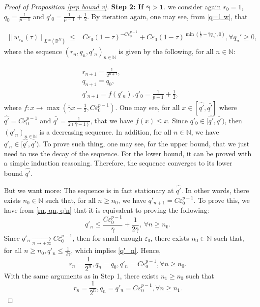 \documentclass[11pt,a4paper]{article}
\newcommand{\1}{\mathbbm{1}}
\numberwithin{equation}{section}
\newcommand{\numberset}{\mathbb}
\newcommand{\N}{\numberset{N}}
\newcommand{\R}{\numberset{R}}
\theoremstyle{remark}
\begin{document}
\begin{proof}[Proof of Proposition \ref{prp bound v}]
\textbf{Step 2: If} $\mathbf{\bar \gamma>1}$. we consider again  $r_0=1$, $q_0=\frac{1}{p-1}$ and $q'_0=\frac{1}{p-1}+\frac{1}{2}$. By iteration again, one may see, from \eqref{q=1 w}, that

\begin{equation*}
\begin{split}
\|w_{r_n}(\tau)\|_{L^\infty(\R^N)}\leq& C\varepsilon_0(1-\tau)^{-C\varepsilon_0^{p-1}}+C\varepsilon_0(1-\tau)^{\min(\frac{1}{2}-\bar \gamma q_n',0)}, \forall q_n'\geq 0,
\end{split}
\end{equation*}
where the sequence $(r_n, q_n,q'_n)_{n\in \N}$ is given by 
the following, for all $n\in \N$:

\begin{equation}\label{rn, qn, q'n}
\begin{split}
&r_{n+1}=\frac{1}{2^{n+1}},\\
& q_{n+1}=q_0,\\
&q'_{n+1}=f(q'_n), q'_0=\frac{1}{p-1}+\frac{1}{2},
\end{split}
\end{equation}
where $f:x\rightarrow\max(\bar \gamma x-\frac{1}{2},C\varepsilon_0^{p-1})$. One may see, for all $x\in [\hat{q'},\bar{q'}]$ where $\hat{q'}=C\varepsilon_0^{p-1}$ and $\bar{q'}=\frac{1}{2(\bar \gamma-1)}$, that we have $f(x)\leq x$. Since $q'_0\in [\hat{q'},\bar{q'})$, then $(q'_n)_{n\in \N}$ is a decreasing sequence. In addition, for all $n\in \N$, we have $q'_n\in [\hat{q'},\bar{q'})$. To prove such thing, one may see, for the upper bound, that we just need to use the decay of the sequence. For the lower bound, it can be proved with a simple induction reasoning. Therefore, the sequence converges to its lower bound $\hat{q'}$.

But we want more: The sequence is in fact stationary at $\hat{q'}$. In other words, there exists $n_0\in \N$ such that, for all $n\geq n_0$, we have $q'_{n+1}=C\varepsilon_0^{p-1}$. To prove this, we have from \eqref{rn, qn, q'n} that it is equivalent to proving the following:
\begin{equation}\label{q'_n}
q'_n\leq \frac{C\varepsilon_0^{p-1}}{\bar \gamma}+\frac{1}{2\bar{\gamma}},\ \forall n\geq n_0.
\end{equation}
Since $q'_n\underset{n\rightarrow +\infty}{\longrightarrow} C\varepsilon_0^{p-1}$, then for small enough $\varepsilon_0$, there exists $n_0\in \N$ such that, for all $n\geq n_0, q'_n\leq \frac{1}{2\bar{\gamma}}$, which implies 
\eqref{q'_n}. Hence,
\begin{equation*}
r_n=\frac{1}{2^{n}}, q_n=q_0,q'_n=C\varepsilon_0^{p-1}, \forall n\geq n_0.
\end{equation*}
With the same arguments as in Step 1, there exists $n_1\geq n_0$ such that
\begin{equation*}
r_n=\frac{1}{2^{n}}, q_n=q'_n=C\varepsilon_0^{p-1}, \forall n\geq n_1.
\end{equation*}







\end{proof}
\end{document}
